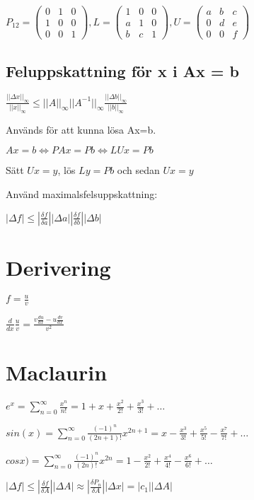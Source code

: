 \documentclass[12pt,a4paper]{article}
\begin{document}
$P_{12} = 
\begin{pmatrix}
0 & 1 & 0 \\
1 & 0 & 0 \\
0 & 0 & 1
\end{pmatrix}
,
L = 
\begin{pmatrix}
1 & 0 & 0 \\
a & 1 & 0 \\
b & c & 1
\end{pmatrix}
,
U = 
\begin{pmatrix}
a & b & c \\
0 & d & e \\
0 & 0 & f
\end{pmatrix}
$


\subsection{Feluppskattning för x i Ax = b}
$\frac{||\Delta x||_\infty}{||x||_\infty} \leq ||A||_\infty ||A^{-1}||_\infty \frac{||\Delta b||_\infty}{||b||_\infty}$


Används för att kunna lösa Ax=b.

$Ax = b \Leftrightarrow PAx = Pb \Leftrightarrow LUx = Pb$

Sätt $Ux = y$, lös $Ly = Pb$ och sedan $Ux = y$

Använd maximalsfelsuppskattning:

$|\Delta f| \leq |\frac{\delta f}{\delta a}| |\Delta a| 
|\frac{\delta f}{\delta b}| |\Delta b|$ 

\section{Derivering}

$f = \frac{u}{v} $

$\frac{d}{dx}\frac{u}{v} = \frac{v\frac{du}{dx}-u\frac{dv}{dx}}{v^2}$

\section{Maclaurin}

$ e^x = \sum_{n=0}^{\infty} \frac{x^n}{n!} = 1 + x + \frac{x^2}{2!} + \frac{x^3}{3!} + \ldots $

$ sin(x) = \sum_{n=0}^{\infty} \frac{(-1)^n}{(2n+1)!} x^{2n+1} = x - \frac{x^3}{3!} + \frac{x^5}{5!} - \frac{x^7}{7!} + \ldots$

$ cosx) = \sum_{n=0}^{\infty} \frac{(-1)^n}{(2n)!} x^{2n} = 1 - \frac{x^2}{2!} + \frac{x^4}{4!} - \frac{x^6}{6!} + \ldots$

$|\Delta f| \leq |\frac{\delta f}{\delta A}| |\Delta A| \approx |\frac{\delta P_n}{\delta A}| |\Delta x| = |c_1||\Delta A|$ 
\end{document}
